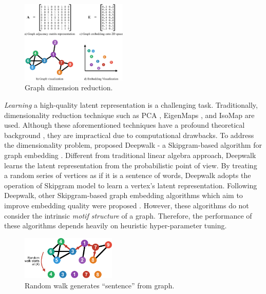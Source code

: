 \documentclass[letterpaper]{article}
\begin{document}
        \begin{figure}
            \centering
            \includegraphics[width=0.45\textwidth]{fig1_dimrec}
            \caption{Graph dimension reduction.}
            \label{fig:dimrec}
        \end{figure}

        \emph{Learning} a high-quality latent representation is a challenging task. Traditionally,
        dimensionality reduction technique such as PCA \cite{pca}, EigenMaps \cite{eigmaps}, and IsoMap 
        \cite{isomap} are used. Although these aforementioned techniques have a profound theoretical
        background \cite{dimrecrev}, they are impractical due to computational drawbacks. To address
        the dimensionality problem, \cite{deepwalk} proposed Deepwalk - a Skipgram-based algorithm
        for graph embedding \cite{deepwalk}. Different from traditional linear algebra approach,
        Deepwalk learns the latent representation from the probabilistic point of view. By treating
        a random series of vertices as if it is a sentence of words, Deepwalk adopts the operation
        of Skipgram model \cite{skipgram} to learn a vertex's latent representation. Following
        Deepwalk, other Skipgram-based graph embedding algorithms which aim to improve embedding
        quality were proposed \cite{grarep,line,planetoid,node2vec}. However, these algorithms
        do not consider the intrinsic \emph{motif structure} of a graph. Therefore, the performance
        of these algorithms depends heavily on heuristic hyper-parameter tuning.

        \begin{figure}
            \centering
            \includegraphics[width=0.4\textwidth]{fig2_congen}
            \caption{Random walk generates ``sentence'' from graph.}
            \label{fig:congen}
        \end{figure}
\end{document}
